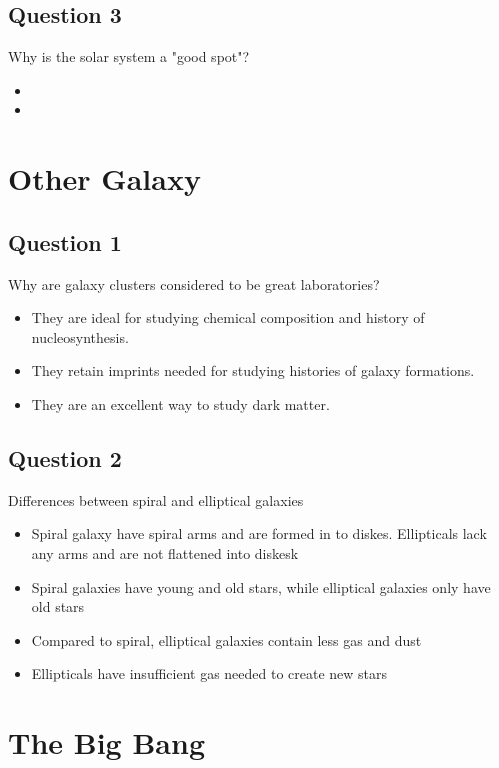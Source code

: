 \subsection{Question 3}
Why is the solar system a "good spot"?
\begin{itemize}
    \item {}
    \item {}
\end{itemize}

\section{Other Galaxy}
\subsection{Question 1}
Why are galaxy clusters considered to be great laboratories?
\begin{itemize}
    \item They are ideal for studying chemical composition and history of nucleosynthesis.
    \item They retain imprints needed for studying histories of galaxy formations.
    \item They are an excellent way to study dark matter.
\end{itemize}

\subsection{Question 2}
Differences between spiral and elliptical galaxies
\begin{itemize}
    \item Spiral galaxy have spiral arms and are formed in to diskes. Ellipticals lack any arms and are not flattened into diskesk
    \item Spiral galaxies have young and old stars, while elliptical galaxies only have old stars
    \item Compared to spiral, elliptical galaxies contain less gas and dust
    \item Ellipticals have insufficient gas needed to create new stars
\end{itemize}

\section{The Big Bang}

